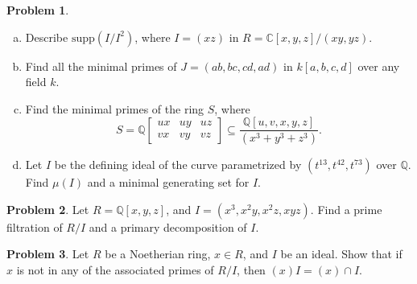 \documentclass[11pt]{article}
\theoremstyle{definition}
\newtheorem{problem}{Problem}
\begin{document}
\begin{problem}$\,$
	\begin{enumerate}[a)]
		\item Describe $\textrm{supp}(I/I^2)$, where $I = (xz)$ in $R = \mathbb{C}[x,y,z]/(xy,yz)$.		\item Find all the minimal primes of $J = (ab,bc,cd,ad)$ in $k[a,b,c,d]$ over any field $k$.
		\item Find the minimal primes of the ring $S$, where
		$$S = \mathbb{Q} \begin{bmatrix} ux & uy & uz \\ vx & vy & vz \end{bmatrix} \subseteq \frac{\mathbb{Q}[u,v,x,y,z]}{(x^3+y^3+z^3)}.$$
		\item Let $I$ be the defining ideal of the curve parametrized by $(t^{13},t^{42},t^{73})$ over $\mathbb{Q}$. Find $\mu(I)$ and a minimal generating set for $I$.
	\end{enumerate}
\end{problem}


\begin{problem}
Let $R=\mathbb{Q}[x,y,z]$, and $I=(x^3, x^2y, x^2z, xyz)$. Find a prime filtration of $R/I$ and a primary decomposition of $I$.	
\end{problem}



\begin{problem}
	Let $R$ be a Noetherian ring, $x \in R$, and $I$ be an ideal. Show that if $x$ is not in any of the associated primes of $R/I$, then $(x)I = (x) \cap I$.
\end{problem}
\end{document}
